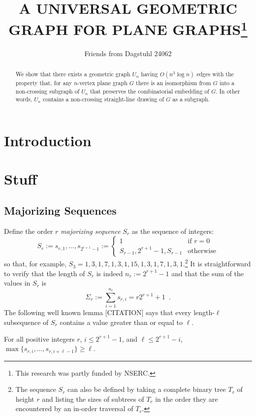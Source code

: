 \documentclass{patmorin}
\title{\MakeUppercase{A Universal Geometric Graph for Plane Graphs}\thanks{This research was partly funded by NSERC.}}
\author{Friends from Dagstuhl 24062}
\date{}
\newcommand{\defin}[1]{\emph{\color{brightmaroon}#1}}
\begin{document}
\maketitle
\renewcommand{\E}{\mathbb{E}}
\renewcommand{\Pr}{\mathbb{P}}

\begin{abstract}
  We show that there exists a geometric graph $U_n$ having $O(n^3\log n)$ edges with the property that, for any $n$-vertex plane graph $G$ there is an isomorphism from $G$ into a non-crossing subgraph of $U_n$ that preserves the combinatorial embedding of $G$.  In other words, $U_n$ contains a non-crossing straight-line drawing of $G$ as a subgraph.
\end{abstract}

\section{Introduction}



\section{Stuff}

\subsection{Majorizing Sequences}

Define the order $r$ \defin{majorizing sequence} $S_r$ as the sequence of integers:
\[
   S_r := s_{r,1},\ldots,s_{2^{r+1}-1} :=
    \begin{cases}
      1& \text{if $r=0$} \\
      S_{r-1},2^{r+1}-1,S_{r-1} & \text{otherwise}
    \end{cases}
\]
so that, for example, $S_3=1,3,1,7,1,3,1,15,1,3,1,7,1,3,1$.\footnote{The sequence $S_r$ can also be defined by taking a complete binary tree $T_r$ of height $r$ and listing the sizes of subtrees of $T_r$ in the order they are encountered by an in-order traversal of $T_r$.}  It is straightforward to verify that the length of $S_r$ is indeed $n_r:=2^{r+1}-1$ and that the sum of the values in $S_r$ is
\begin{equation}
  \Sigma_r := \sum_{i=1}^{n_r} s_{r,i} = r2^{r+1}+1 \enspace . \label{sigma_r}
\end{equation}
The following well known lemma [CITATION] says that every length-$\ell$ subsequence of $S_r$ contains a value greater than or equal to $\ell$.
\begin{lem}
  For all positive integers $r$, $i\le 2^{r+1}-1$, and $\ell\le 2^{r+1}-i$, $\max\{s_{r,i},\ldots,s_{r,i+\ell-1}\}\ge \ell$.
\end{lem}
\end{document}
